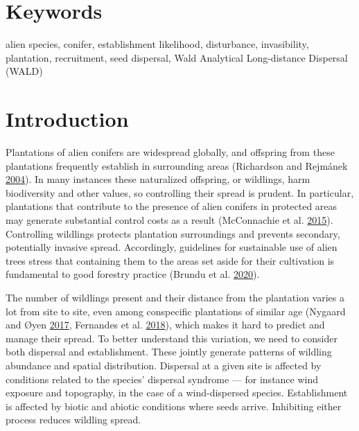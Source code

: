 \documentclass[
]{article}
\begin{document}
\hypertarget{keywords}{%
\section{Keywords}\label{keywords}}

alien species, conifer, establishment likelihood, disturbance, invasibility, plantation, recruitment, seed dispersal, Wald Analytical Long-distance Dispersal (WALD)

\hypertarget{introduction}{%
\section{Introduction}\label{introduction}}

Plantations of alien conifers are widespread globally, and offspring from these plantations frequently establish in surrounding areas (Richardson and Rejmánek \protect\hyperlink{ref-richardsonConifersInvasiveAliens2004}{2004}).
In many instances these naturalized offspring, or wildlings, harm biodiversity and other values, so controlling their spread is prudent.
In particular, plantations that contribute to the presence of alien conifers in protected areas may generate substantial control costs as a result (McConnachie et al. \protect\hyperlink{ref-mcconnachieEstimatingEffectPlantations2015}{2015}).
Controlling wildlings protects plantation surroundings and prevents secondary, potentially invasive spread.
Accordingly, guidelines for sustainable use of alien trees stress that containing them to the areas set aside for their cultivation is fundamental to good forestry practice (Brundu et al. \protect\hyperlink{ref-brunduGlobalGuidelinesSustainable2020}{2020}).

The number of wildlings present and their distance from the plantation varies a lot from site to site, even among conspecific plantations of similar age (Nygaard and Øyen \protect\hyperlink{ref-nygaardSpreadIntroducedSitka2017}{2017}, Fernandes et al. \protect\hyperlink{ref-fernandesWhatDrivesEucalyptus2018}{2018}), which makes it hard to predict and manage their spread.
To better understand this variation, we need to consider both dispersal and establishment.
These jointly generate patterns of wildling abundance and spatial distribution.
Dispersal at a given site is affected by conditions related to the species' dispersal syndrome --- for instance wind exposure and topography, in the case of a wind-dispersed species.
Establishment is affected by biotic and abiotic conditions where seeds arrive.
Inhibiting either process reduces wildling spread.
\end{document}

